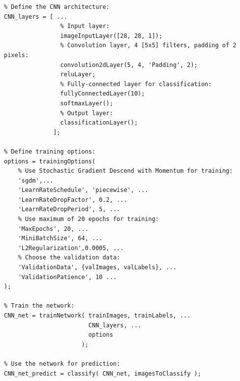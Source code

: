 \documentclass[letterpaper,12pt]{article}
\begin{document}
\begin{lstlisting}
% Define the CNN architecture:
CNN_layers = [ ...
                % Input layer:
                imageInputLayer([28, 28, 1]);
                % Convolution layer, 4 [5x5] filters, padding of 2 pixels: 
                convolution2dLayer(5, 4, 'Padding', 2);
                reluLayer;
                % Fully-connected layer for classification:
                fullyConnectedLayer(10);
                softmaxLayer();
                % Output layer:
                classificationLayer();
              ];
              
% Define training options:
options = trainingOptions(
    % Use Stochastic Gradient Descend with Momentum for training:
    'sgdm',...
    'LearnRateSchedule', 'piecewise', ...
    'LearnRateDropFactor', 0.2, ...
    'LearnRateDropPeriod', 5, ...
    % Use maximum of 20 epochs for training:
    'MaxEpochs', 20, ...
    'MiniBatchSize', 64, ...
    'L2Regularization',0.0005, ...
    % Choose the validation data:
    'ValidationData', {valImages, valLabels}, ...
    'ValidationPatience', 10 ...
);

% Train the network:
CNN_net = trainNetwork( trainImages, trainLabels, ...
                        CNN_layers, ...
                        options 
                      );
                
% Use the network for prediction:
CNN_net_predict = classify( CNN_net, imagesToClassify );
\end{lstlisting}
\end{document}
